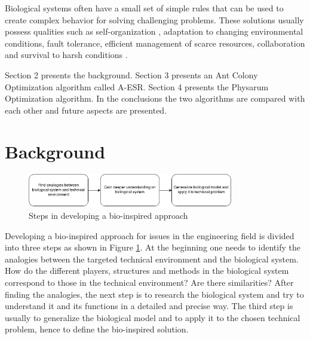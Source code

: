 \documentclass[cameraready]{IWORK2014}
\begin{document}
Biological systems often have a small set of simple rules that can be used to create complex behavior \cite{dressler2010bio} for solving challenging problems. These solutions usually possess qualities such as self-organization \cite{kroeker2011biology}, adaptation to changing environmental conditions, fault tolerance, efficient management of scarce resources, collaboration and survival to harsh conditions \cite{dressler2010bio}.

Section 2 presents the background. Section 3 presents an Ant Colony Optimization algorithm called A-ESR. Section 4 presents the Physarum Optimization algorithm. In the conclusions the two algorithms are compared with each other and future aspects are presented.

\section{Background}

\begin{figure}
    \centering
    \includegraphics[width=0.8\textwidth]{bio-inspired-steps.png}
    \caption{Steps in developing a bio-inspired approach}
    \label{fig:bio-inspired-steps}
\end{figure}

Developing a bio-inspired approach for issues in the engineering field is divided into three steps \cite{dressler2010bio} as shown in Figure \ref{fig:bio-inspired-steps}. At the beginning one needs to identify the analogies between the targeted technical environment and the biological system. How do the different players, structures and methods in the biological system correspond to those in the technical environment? Are there similarities? After finding the analogies, the next step is to research the biological system and try to understand it and its functions in a detailed and precise way. The third step is usually to generalize the biological model and to apply it to the chosen technical problem, hence to define the bio-inspired solution.
\end{document}
